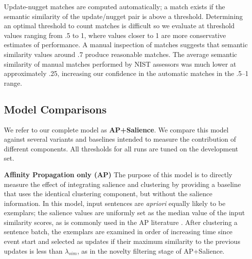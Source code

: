 Update-nugget matches are computed automatically; a
match exists if the semantic similarity of the update/nugget pair is above 
a threshold.
Determining an optimal threshold to count matches is difficult so 
we evaluate at 
threshold values ranging
from .5 to 1, where values closer to 1 are more conservative estimates of
performance.
A manual inspection of matches 
suggests that semantic similarity values around .7 produce reasonable matches.
The average semantic similarity of manual matches performed 
by NIST assessors was much lower at approximately .25, increasing
our confidence in the automatic matches in the .5--1 range.


\subsection{Model Comparisons}
We refer to our complete model as \textbf{AP+Salience}.  We compare this model against several variants and baselines intended to measure the contribution of different components. All thresholds
for all runs are tuned on the development set.

\textbf{Affinity Propagation only (AP) } The purpose of this model
is to directly measure the effect of integrating salience and clustering by providing a baseline that uses the identical 
clustering component, but without the salience information.
In this model, input sentences are \textit{apriori} equally likely to be exemplars;
the salience values are uniformly set as the median value of the 
input similarity scores, as is commonly used in the AP literature \cite{frey2007clustering}.
After clustering a sentence batch, the exemplars are examined in order
of increasing time since event start and selected as updates if their
maximum similarity to the previous updates is less than $\lambda_{sim}$,
as in the novelty filtering stage of AP+Salience.

